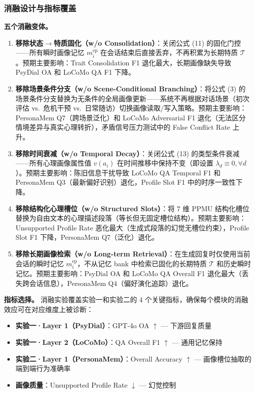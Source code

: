 \documentclass[12pt,a4paper]{article}
\begin{document}
\subsubsection{消融设计与指标覆盖}

\textbf{五个消融变体。}
\begin{enumerate}
  \item \textbf{移除状态$\to$特质固化（w/o Consolidation）}：关闭公式 (11) 的固化门控——所有瞬时画像记忆 $m_i^{\text{ep}}$ 在会话结束后直接丢弃，不再积累为长期特质 $\mathcal{T}$。预期主要影响：Trait Consolidation F1 退化最大，长期画像缺失导致 PsyDial OA 和 LoCoMo QA F1 下降。
  \item \textbf{移除场景条件分支（w/o Scene-Conditional Branching）}：将公式 (3) 的场景条件分支替换为无条件的全局画像更新——系统不再根据对话场景（初次评估 vs.\ 危机干预 vs.\ 日常随访）切换画像读取/写入策略。预期主要影响：PersonaMem Q7（跨场景泛化）和 LoCoMo Adversarial F1 退化（无法区分情境差异与真实心理转折），矛盾信号压力测试中的 False Conflict Rate 上升。
  \item \textbf{移除时间衰减（w/o Temporal Decay）}：关闭公式 (13) 的类型条件衰减——所有心理画像属性值 $v(a_i)$ 在时间推移中保持不变（即设置 $\lambda_d \equiv 0, \forall d$）。预期主要影响：陈旧信息干扰导致 LoCoMo QA Temporal F1 和 PersonaMem Q3（最新偏好识别）退化，Profile Slot F1 中的时序一致性下降。
  \item \textbf{移除结构化心理槽位（w/o Structured Slots）}：将 7 维 PPMU 结构化槽位替换为自由文本的心理描述段落（等长但无固定槽位结构）。预期主要影响：Unsupported Profile Rate 恶化最大（生成式段落的幻觉无槽位约束），Profile Slot F1 下降，PersonaMem Q7（泛化）退化。
  \item \textbf{移除长期画像检索（w/o Long-term Retrieval）}：在生成回复时仅使用当前会话的瞬时记忆 $m_i^{\text{ep}}$，不从记忆 bank 中检索已固化的长期特质 $\mathcal{T}$ 和历史瞬时记忆。预期主要影响：PsyDial OA 和 LoCoMo QA Overall F1 退化最大（丢失跨会话信息），PersonaMem Q4（偏好演化追踪）退化。
\end{enumerate}

\textbf{指标选择。} 消融实验覆盖实验一和实验二的 4 个关键指标，确保每个模块的消融效应可在对应维度上被诊断：

\begin{itemize}
  \item \textbf{实验一·Layer 1（PsyDial）}：GPT-4o OA $\uparrow$ — 下游回复质量
  \item \textbf{实验一·Layer 2（LoCoMo）}：QA Overall F1 $\uparrow$ — 通用记忆保持
  \item \textbf{实验二·Layer 1（PersonaMem）}：Overall Accuracy $\uparrow$ — 画像槽位抽取的端到端行为准确率
  \item \textbf{画像质量}：Unsupported Profile Rate $\downarrow$ — 幻觉控制
\end{itemize}
\end{document}
